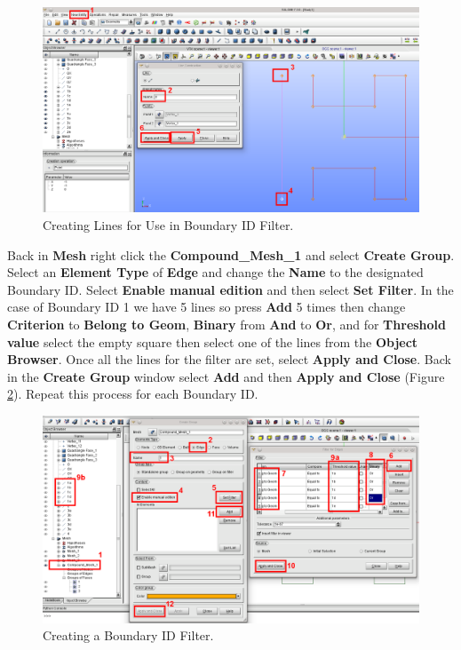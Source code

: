 \begin{figure}[tbp]
\begin{center}
\includegraphics[scale=0.40]{figures/SalomeStep6.png}
\caption{Creating Lines for Use in Boundary ID Filter.}
\label{fig:no3.2.1.16}
\end{center}
\end{figure}

Back in \textbf{Mesh} right click the \textbf{Compound\_Mesh\_1} and select \textbf{Create Group}.  Select an \textbf{Element Type} of \textbf{Edge} and change the \textbf{Name} to the designated  Boundary ID. Select \textbf{Enable manual edition} and then select \textbf{Set Filter}.  In the case of Boundary ID 1 we have 5 lines so press \textbf{Add} 5 times then change   \textbf{Criterion} to \textbf{Belong to Geom}, \textbf{Binary} from \textbf{And} to \textbf{Or},  and for \textbf{Threshold value} select the empty square then select one of the lines from the  \textbf{Object Browser}. Once all the lines for the filter are set, select \textbf{Apply and Close}. Back in the \textbf{Create Group} window select \textbf{Add} and then \textbf{Apply and Close} (Figure \ref{fig:no3.2.1.17}). Repeat this process for each Boundary ID.
  
\begin{figure}[tbp]
\begin{center}
\includegraphics[scale=0.40]{figures/SalomeStep6b.png}
\caption{Creating a Boundary ID Filter.}
\label{fig:no3.2.1.17}
\end{center}
\end{figure}

